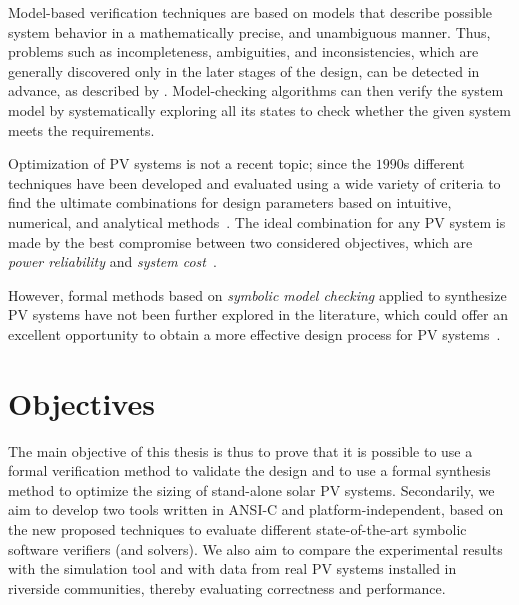 Model-based verification techniques are based on models that describe possible system behavior in a mathematically precise, and unambiguous manner. Thus, problems such as incompleteness, ambiguities, and inconsistencies, which are generally discovered only in the later stages of the design, can be detected in advance, as described by \cite{Trindade,TrindadeDJISC17}. 
Model-checking algorithms can then verify the system model by systematically exploring all its states to check whether the given system meets the requirements.
%
%

Optimization of PV systems is not a recent topic; since the $1990$s different techniques have been developed and evaluated using a wide variety of criteria to find the ultimate combinations for design parameters based on intuitive, numerical, and analytical methods~\cite{Applasamy2011}. The ideal combination for any PV system is made by the best compromise between two considered objectives, which are \textit{power reliability} and \textit{system cost}~\cite{Alsadi2018}.
 
However, formal methods based on \textit{symbolic model checking} applied to synthesize PV systems have not been further explored in the literature, which could offer an excellent opportunity to obtain a more effective design process for PV systems~\cite{ClarkeHV18}.

\section{Objectives}

The main objective of this thesis is thus to prove that it is possible to use a formal verification method to validate the design and to use a formal synthesis method to optimize the sizing of stand-alone solar PV systems. Secondarily, we aim to develop two tools written in ANSI-C and platform-independent, based on the new proposed techniques to evaluate different state-of-the-art symbolic software verifiers (and solvers). We also aim to compare the experimental results with the simulation tool and with data from real PV systems installed in riverside communities, thereby evaluating correctness and performance.

